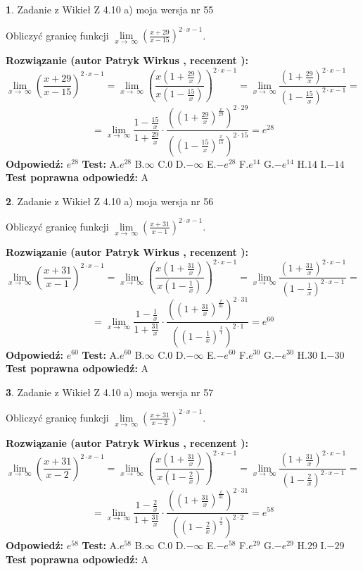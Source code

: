 \documentclass[12pt, a4paper]{article}
\theoremstyle{definition} %
\newtheorem{zad}{}
\newcommand{\zadStart}[1]{\begin{zad}#1\newline}
\newcommand{\zadStop}{\end{zad}}
\newcommand{\rozwStart}[2]{\noindent \textbf{Rozwiązanie (autor #1 , recenzent #2): }\newline}
\newcommand{\rozwStop}{\newline}
\newcommand{\odpStart}{\noindent \textbf{Odpowiedź:}\newline}
\newcommand{\odpStop}{\newline}
\newcommand{\testStart}{\noindent \textbf{Test:}\newline}
\newcommand{\testStop}{\newline}
\newcommand{\kluczStart}{\noindent \textbf{Test poprawna odpowiedź:}\newline}
\newcommand{\kluczStop}{\newline}
\begin{document}
\zadStart{Zadanie z Wikieł Z 4.10 a) moja wersja nr 55}

Obliczyć granicę funkcji  $\lim\limits_{x\to\ \infty}(\frac{x+29}{x-15})^{2\cdot x-1}$.
\zadStop
\rozwStart{Patryk Wirkus}{}
$$\lim\limits_{x\to\ \infty}(\frac{x+29}{x-15})^{2\cdot x-1} = \lim\limits_{x\to\ \infty}(\frac{x(1+\frac{29}{x})}{x(1-\frac{15}{x})})^{2\cdot x-1}=\lim\limits_{x\to\ \infty}\frac{(1+\frac{29}{x})^{2\cdot x-1}}{(1-\frac{15}{x})^{2\cdot x-1}}=$$
$$=\lim\limits_{x\to\ \infty}\frac{1-\frac{15}{x}}{1+\frac{29}{x}}\cdot\frac{((1+\frac{29}{x})^{\frac{x}{29}})^{2\cdot29}}{((1-\frac{15}{x})^{\frac{x}{15}})^{2\cdot15}}=e^{28}$$
\rozwStop
\odpStart
$e^{28}$
\odpStop
\testStart
A.$e^{28}$ B.$\infty$ C.$0$ D.$-\infty$ E.$-e^{28}$
F.$e^{14}$ G.$-e^{14}$
H.$14$
I.$-14$
\testStop
\kluczStart
A
\kluczStop



\zadStart{Zadanie z Wikieł Z 4.10 a) moja wersja nr 56}

Obliczyć granicę funkcji  $\lim\limits_{x\to\ \infty}(\frac{x+31}{x-1})^{2\cdot x-1}$.
\zadStop
\rozwStart{Patryk Wirkus}{}
$$\lim\limits_{x\to\ \infty}(\frac{x+31}{x-1})^{2\cdot x-1} = \lim\limits_{x\to\ \infty}(\frac{x(1+\frac{31}{x})}{x(1-\frac{1}{x})})^{2\cdot x-1}=\lim\limits_{x\to\ \infty}\frac{(1+\frac{31}{x})^{2\cdot x-1}}{(1-\frac{1}{x})^{2\cdot x-1}}=$$
$$=\lim\limits_{x\to\ \infty}\frac{1-\frac{1}{x}}{1+\frac{31}{x}}\cdot\frac{((1+\frac{31}{x})^{\frac{x}{31}})^{2\cdot31}}{((1-\frac{1}{x})^{\frac{x}{1}})^{2\cdot1}}=e^{60}$$
\rozwStop
\odpStart
$e^{60}$
\odpStop
\testStart
A.$e^{60}$ B.$\infty$ C.$0$ D.$-\infty$ E.$-e^{60}$
F.$e^{30}$ G.$-e^{30}$
H.$30$
I.$-30$
\testStop
\kluczStart
A
\kluczStop



\zadStart{Zadanie z Wikieł Z 4.10 a) moja wersja nr 57}

Obliczyć granicę funkcji  $\lim\limits_{x\to\ \infty}(\frac{x+31}{x-2})^{2\cdot x-1}$.
\zadStop
\rozwStart{Patryk Wirkus}{}
$$\lim\limits_{x\to\ \infty}(\frac{x+31}{x-2})^{2\cdot x-1} = \lim\limits_{x\to\ \infty}(\frac{x(1+\frac{31}{x})}{x(1-\frac{2}{x})})^{2\cdot x-1}=\lim\limits_{x\to\ \infty}\frac{(1+\frac{31}{x})^{2\cdot x-1}}{(1-\frac{2}{x})^{2\cdot x-1}}=$$
$$=\lim\limits_{x\to\ \infty}\frac{1-\frac{2}{x}}{1+\frac{31}{x}}\cdot\frac{((1+\frac{31}{x})^{\frac{x}{31}})^{2\cdot31}}{((1-\frac{2}{x})^{\frac{x}{2}})^{2\cdot2}}=e^{58}$$
\rozwStop
\odpStart
$e^{58}$
\odpStop
\testStart
A.$e^{58}$ B.$\infty$ C.$0$ D.$-\infty$ E.$-e^{58}$
F.$e^{29}$ G.$-e^{29}$
H.$29$
I.$-29$
\testStop
\kluczStart
A
\kluczStop
\end{document}

